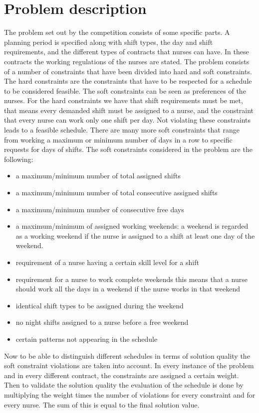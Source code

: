 \documentclass{article}
\begin{document}
\section{Problem description}
The problem set out by the competition consists of some specific parts. A planning period is specified along with shift types, the day and shift requirements, and the different types of contracts that nurses can have. In these contracts the working regulations of the nurses are stated.
The problem consists of a number of constraints that have been divided into hard and soft constraints. The hard constraints are the constraints that have to be respected for a schedule to be considered feasible. The soft constraints can be seen as preferences of the nurses.
For the hard constraints we have that shift requirements must be met, that means every demanded shift must be assigned to a nurse, and the constraint that every nurse can work only one shift per day. Not violating these constraints leads to a feasible schedule.
There are many more soft constraints that range from working a maximum or minimum number of days in a row to specific requests for days of shifts.
The soft constraints considered in the problem are the following:
\begin{itemize}
	\item a maximum/minimum number of total assigned shifts
	\item a maximum/minimum number of total consecutive assigned shifts
	\item a maximum/minimum number of consecutive free days 
	\item a maximum/minimum of assigned working weekends:
	a weekend is regarded as a working weekend if the nurse is assigned to a shift at least one day of the weekend.
	\item requirement of a nurse having a certain skill level for a shift
	\item requirement for a nurse to work complete weekends
	this means that a nurse should work all the days in a weekend if the nurse works in that weekend
	\item identical shift types to be assigned during the weekend
	\item no night shifts assigned to a nurse before a free weekend
	\item certain patterns not appearing in the schedule
\end{itemize}
Now to be able to distinguish different schedules in terms of solution quality the soft constraint violations are taken into account. 
In every instance of the problem and in every different contract, the constraints are assigned a certain weight. Then to validate the solution quality the evaluation of the schedule is done by multiplying the weight times the number of violations for every constraint and for every nurse. The sum of this is equal to the final solution value.
\end{document}
